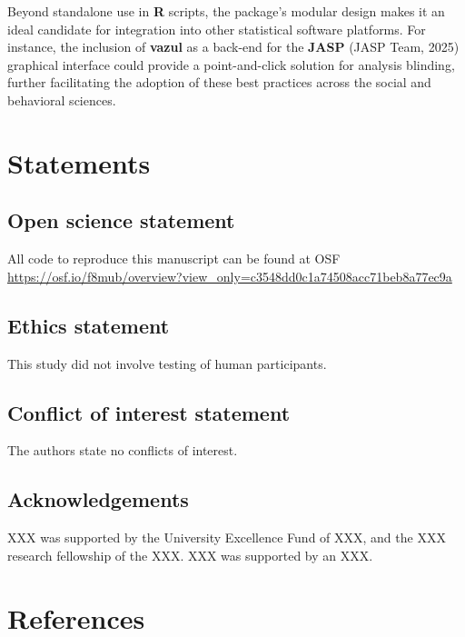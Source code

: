 \documentclass[
  english,
  man,floatsintext]{apa6}
\begin{document}
Beyond standalone use in \textbf{R} scripts, the package's modular design makes it an ideal candidate for integration into other statistical software platforms. For instance, the inclusion of \textbf{vazul} as a back-end for the \textbf{JASP} (JASP Team, 2025) graphical interface could provide a point-and-click solution for analysis blinding, further facilitating the adoption of these best practices across the social and behavioral sciences.

\section{Statements}\label{statements}

\subsection{Open science statement}\label{open-science-statement}

All code to reproduce this manuscript can be found at OSF \url{https://osf.io/f8mub/overview?view_only=c3548dd0c1a74508acc71beb8a77ec9a}

\subsection{Ethics statement}\label{ethics-statement}

This study did not involve testing of human participants.

\subsection{Conflict of interest statement}\label{conflict-of-interest-statement}

The authors state no conflicts of interest.

\subsection{Acknowledgements}\label{acknowledgements}

XXX was supported by the University Excellence Fund of XXX, and the XXX research fellowship of the XXX. XXX was supported by an XXX.

\section*{References}\label{references}
\end{document}
